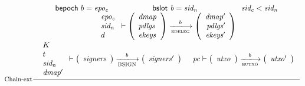 \begin{figure}
  \begin{equation}
    \label{eq:rule:chain-extension}
    \inference[Chain-ext]
    { \fun{bepoch}~b = \var{epo_c}
      & \bslot{b} = \var{sid_n} 
      & \var{sid_c} < \var{sid_n} \\
      {\begin{array}{l}
         \var{epo_c}\\
         \var{sid_n}\\
         d
       \end{array}}
      \vdash
      {
        \left(
          \begin{array}{l}
            \var{dmap}\\
            \var{pdlgs}\\
            \var{ekeys}
          \end{array}
        \right)
      }
      \trans{bdeleg}{b}
      {
        \left(
          \begin{array}{r}
            \var{dmap'}\\
            \var{pdlgs'}\\
            \var{ekeys'}
          \end{array}
        \right)
      }
      \\
      {\begin{array}{l}
         K\\
         t\\
         \var{sid_n}\\
         \var{dmap'}
      \end{array}}
      \vdash
      {
        \left(
          \begin{array}{l}
            \var{signers}
          \end{array}
        \right)
      }
      \trans{BSIGN}{b}
      {
        \left(
          \begin{array}{l}
            \var{signers'}
          \end{array}
        \right)
      }      
      &
      {
        \var{pc} \vdash
        \left(
          \begin{array}{l}
            \var{utxo}\\
          \end{array}
        \right)
      }
      \trans{butxo}{b}
      {
        \left(
          \begin{array}{r}
            \var{utxo'}\\
          \end{array}
        \right)
      }
    }
    {
      {\begin{array}{l}

\end{array}}}
\end{equation}
\end{figure}
